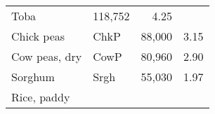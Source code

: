 \documentclass[]{article}
\begin{document}
\begin{longtable}[]{@{}llrr@{}}
\begin{minipage}[t]{0.16\columnwidth}
Toba\strut
\end{minipage} & \begin{minipage}[t]{0.12\columnwidth}\raggedleft\strut
118,752\strut
\end{minipage} & \begin{minipage}[t]{0.09\columnwidth}\raggedleft\strut
4.25\strut
\end{minipage}\tabularnewline
\begin{minipage}[t]{0.36\columnwidth}\raggedright\strut
Chick peas\strut
\end{minipage} & \begin{minipage}[t]{0.16\columnwidth}\raggedright\strut
ChkP\strut
\end{minipage} & \begin{minipage}[t]{0.12\columnwidth}\raggedleft\strut
88,000\strut
\end{minipage} & \begin{minipage}[t]{0.09\columnwidth}\raggedleft\strut
3.15\strut
\end{minipage}\tabularnewline
\begin{minipage}[t]{0.36\columnwidth}\raggedright\strut
Cow peas, dry\strut
\end{minipage} & \begin{minipage}[t]{0.16\columnwidth}\raggedright\strut
CowP\strut
\end{minipage} & \begin{minipage}[t]{0.12\columnwidth}\raggedleft\strut
80,960\strut
\end{minipage} & \begin{minipage}[t]{0.09\columnwidth}\raggedleft\strut
2.90\strut
\end{minipage}\tabularnewline
\begin{minipage}[t]{0.36\columnwidth}\raggedright\strut
Sorghum\strut
\end{minipage} & \begin{minipage}[t]{0.16\columnwidth}\raggedright\strut
Srgh\strut
\end{minipage} & \begin{minipage}[t]{0.12\columnwidth}\raggedleft\strut
55,030\strut
\end{minipage} & \begin{minipage}[t]{0.09\columnwidth}\raggedleft\strut
1.97\strut
\end{minipage}\tabularnewline
\begin{minipage}[t]{0.36\columnwidth}\raggedright\strut
Rice, paddy\strut
\end{minipage} & \begin{minipage}[t]{0.16\columnwidth}\raggedright\strut

\end{minipage}
\end{longtable}
\end{document}
